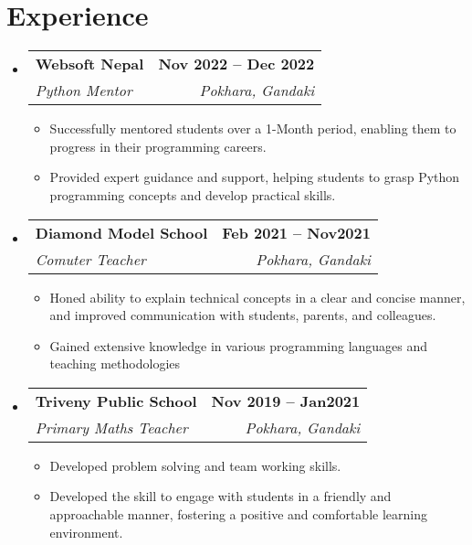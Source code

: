 \documentclass[letterpaper,11pt]{article}
\makeatletter
\newcommand{\resumeItem}[1]{
  \item\small{
    {#1 \vspace{-2pt}}
  }
}
\newcommand{\resumeSubheading}[4]{
  \vspace{-2pt}\item
    \begin{tabular*}{1.0\textwidth}[t]{l@{\extracolsep{\fill}}r}
      \textbf{#1} & \textbf{\small #2} \\
      \textit{\small#3} & \textit{\small #4} \\
    \end{tabular*}\vspace{-7pt}
}
\newcommand{\resumeSubHeadingListStart}{\begin{itemize}[leftmargin=0.0in, label={}]}
\newcommand{\resumeSubHeadingListEnd}{\end{itemize}}
\newcommand{\resumeItemListStart}{\begin{itemize}}
\newcommand{\resumeItemListEnd}{\end{itemize}\vspace{-5pt}}
\makeatother
\begin{document}
\section{Experience}
  \resumeSubHeadingListStart

    \resumeSubheading
      {Websoft Nepal}{Nov 2022 -- Dec 2022}
      {Python Mentor}{Pokhara, Gandaki}
      \resumeItemListStart
        \resumeItem{Successfully mentored students over a 1-Month period, enabling them to progress in their programming careers.}
        \resumeItem{Provided expert guidance and support, helping students to grasp Python programming concepts and develop practical skills.}
      \resumeItemListEnd

    \resumeSubheading
      {Diamond Model School}{Feb 2021 --  Nov2021}
      {Comuter Teacher}{Pokhara, Gandaki}
      \resumeItemListStart
        \resumeItem{Honed ability to explain technical concepts in a clear and concise manner, and improved communication with students, parents, and colleagues.}
        \resumeItem{Gained extensive knowledge in various programming languages and teaching methodologies}
    \resumeItemListEnd
    \resumeSubheading
      {Triveny Public School}{Nov 2019 --  Jan2021}
      {Primary Maths Teacher}{Pokhara, Gandaki}
    \resumeItemListStart
    \resumeItem{Developed problem solving and team working skills.}
        \resumeItem{Developed the skill to engage with students in a friendly and approachable manner, fostering a positive and comfortable learning environment.}
    \resumeItemListEnd
    
  \resumeSubHeadingListEnd
\vspace{-16pt}

\end{document}
